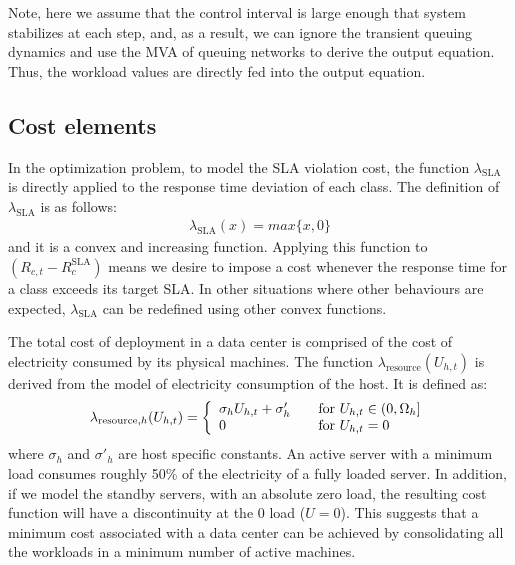  Note, here we assume that the control interval is large enough that system stabilizes at each step, and, as a result, we can ignore the transient queuing dynamics and use the MVA of queuing networks to derive the output equation. Thus, the workload values are directly fed into the output equation.  
% 

  \subsection{Cost elements}  
  \label{sec:cost-elements}
     In the optimization problem, to model the SLA violation cost, the function $\lambda_\text{SLA}$ is directly applied to the response time deviation of each class. The definition of $\lambda_\text{SLA}$ is as follows: 
    \begin{align} \label{eq:placement-sla-cost}
  		\lambda_\text{SLA} (x)=max\{x,0\} 
		\end{align}
  and it is a convex and increasing function. Applying this function to $(R_{c,t} - R_c^\text{SLA})$ means we desire to impose a cost whenever the response time for a class  exceeds its target SLA.
 In other situations where other behaviours are expected, $\lambda_\text{SLA}$ can be redefined using other convex functions.     

 The total cost of deployment in a data center is comprised of the cost of electricity consumed by its physical machines. The function $\lambda_\text{resource}(U_{h,t})$ is derived from the model of electricity consumption of the host. It is defined as: 
  \begin{align} \label{eq:placement-infra-cost}
  \lambda_{\text{resource},h}(U_{h,t})=  \left\{ 
  \begin{array}{l l}
   \sigma_h U_{h,t} + \sigma'_{h}  & \quad  \text{for $U_{h,t}\in (0,\Omega_h]$} \\
    0 & \quad  \text{for $U_{h,t}=0$} \\        
  \end{array} \right. 
   \end{align} 
where $\sigma_h$ and $\sigma'_h$ are host specific constants.  
 An active server with a minimum load consumes roughly 50\% of the electricity of a fully loaded server. In addition, if we model the standby servers, with an absolute zero load, the resulting cost function will have a discontinuity at the $0$ load ($U=0$).  
 This suggests that a minimum cost associated with a data center can be achieved by consolidating all the workloads in a minimum number of active machines. 

